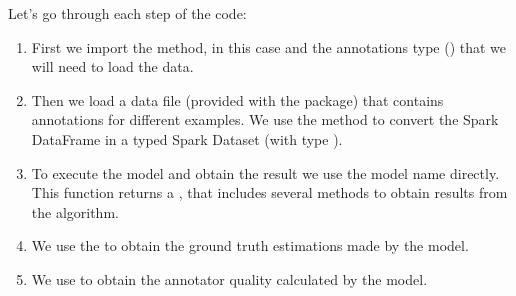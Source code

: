 \documentclass[letterpaper,10pt,english]{sphinxmanual}
\begin{document}
%
\begin{sphinxVerbatim}[commandchars=\\\{\}]
 
 

   

   \PYG{o}{[}\PYG{o}{]}

   

   \PYG{o}{[}\PYG{o}{]}

   
\end{sphinxVerbatim}

Let’s go through each step of the code:
\begin{enumerate}
\def\theenumi{\arabic{enumi}}
\def\labelenumi{\theenumi .}
\makeatletter\def\p@enumii{\p@enumi \theenumi .}\makeatother
\item {} 
First we import the method, in this case  and the annotations type () that
we will need to load the data.

\item {} 
Then we load a data file (provided with the package) that contains annotations for different examples. We use
the method  to convert the Spark DataFrame in a typed Spark Dataset (with type ).

\item {} 
To execute the model and obtain the result we use the model name directly.
This function returns a , that includes several methods to obtain results from the algorithm.

\item {} 
We use the   to obtain the ground truth estimations made by the model.

\item {} 
We use  to obtain the annotator quality calculated by the model.

\end{enumerate}
\end{document}
